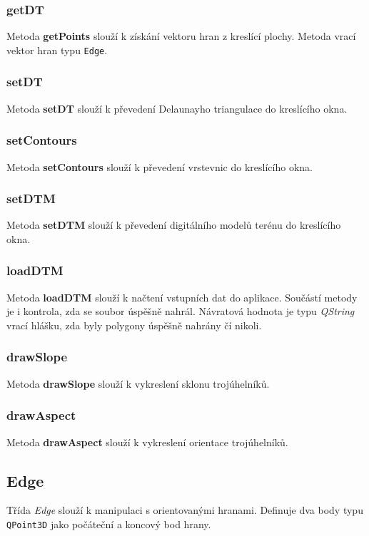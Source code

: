 \documentclass[a4paper, 12pt]{article}
\begin{document}
\subsubsection*{getDT}
Metoda \textbf{getPoints} slouží k získání vektoru hran z kreslící plochy. Metoda vrací vektor hran typu \texttt{Edge}.

\subsubsection*{setDT}
Metoda \textbf{setDT} slouží k převedení Delaunayho triangulace do kreslícího okna.

\subsubsection*{setContours}
Metoda \textbf{setContours} slouží k převedení vrstevnic do kreslícího okna.

\subsubsection*{setDTM}
Metoda \textbf{setDTM} slouží k převedení digitálního modelů terénu do kreslícího okna.

\subsubsection*{loadDTM}
Metoda \textbf{loadDTM} slouží k načtení vstupních dat do aplikace. Součástí metody je i kontrola, zda se soubor úspěšně nahrál. Návratová hodnota je typu \textsl{QString} vrací hlášku, zda byly polygony úspěšně nahrány čí nikoli.

\subsubsection*{drawSlope}
Metoda \textbf{drawSlope} slouží k vykreslení sklonu trojúhelníků.

\subsubsection*{drawAspect}
Metoda \textbf{drawAspect} slouží k vykreslení orientace trojúhelníků.


\subsection{Edge}
Třída \textit{Edge} slouží k manipulaci s orientovanými hranami. Definuje dva body typu \texttt{QPoint3D} jako počáteční a koncový bod hrany.
\end{document}
